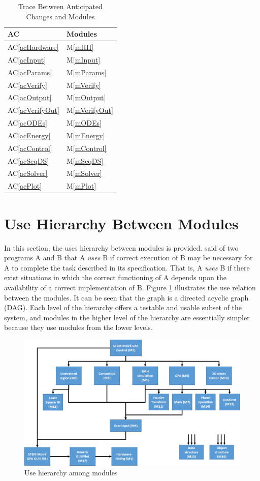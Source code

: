 \documentclass[12pt, titlepage]{article}
\newcommand{\acref}[1]{AC\ref{#1}}
\newcommand{\mref}[1]{M\ref{#1}}
\begin{document}
\begin{table}[H]
\centering
\begin{tabular}{p{} p{}}
\toprule
\textbf{AC} & \textbf{Modules}\\
\midrule
\acref{acHardware} & \mref{mHH}\\
\acref{acInput} & \mref{mInput}\\
\acref{acParams} & \mref{mParams}\\
\acref{acVerify} & \mref{mVerify}\\
\acref{acOutput} & \mref{mOutput}\\
\acref{acVerifyOut} & \mref{mVerifyOut}\\
\acref{acODEs} & \mref{mODEs}\\
\acref{acEnergy} & \mref{mEnergy}\\
\acref{acControl} & \mref{mControl}\\
\acref{acSeqDS} & \mref{mSeqDS}\\
\acref{acSolver} & \mref{mSolver}\\
\acref{acPlot} & \mref{mPlot}\\
\bottomrule
\end{tabular}
\caption{Trace Between Anticipated Changes and Modules}
\label{TblACT}
\end{table}

\section{Use Hierarchy Between Modules} \label{SecUse}

In this section, the uses hierarchy between modules is
provided. \cite{Parnas1978} said of two programs A and B that A {\em uses} B if
correct execution of B may be necessary for A to complete the task described in
its specification. That is, A {\em uses} B if there exist situations in which
the correct functioning of A depends upon the availability of a correct
implementation of B.  Figure \ref{FigUH} illustrates the use relation between
the modules. It can be seen that the graph is a directed acyclic graph
(DAG). Each level of the hierarchy offers a testable and usable subset of the
system, and modules in the higher level of the hierarchy are essentially simpler
because they use modules from the lower levels.

\begin{figure}[H]
\centering
\includegraphics[width=\linewidth]{Figure_Hierarchy.png}
\caption{Use hierarchy among modules}
\label{FigUH}
\end{figure}




\end{document}
